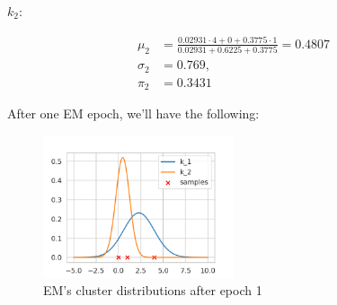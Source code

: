 \documentclass[12pt]{article}
\begin{document}
\begin{enumerate}[leftmargin=\labelsep]
\begin{paracol}{2}
    \switchcolumn

    $k_2$:

    \begin{equation*}
      \begin{aligned}
        \mu_2    & = \frac{0.02931 \cdot 4 + 0 + 0.3775 \cdot 1}{0.02931 + 0.6225 + 0.3775} = 0.4807 \\
        \sigma_2 & = 0.769,                                                                          \\
        \pi_2    & = 0.3431
      \end{aligned}
    \end{equation*}

  \end{paracol}

  After one EM epoch, we'll have the following:

  \begin{figure}[H]
    \centering
    \includegraphics[width = 0.5\textwidth]{assets/ex-3-plot.png}
    \caption{EM's cluster distributions after epoch 1}
  \end{figure}

\end{enumerate}
\end{document}

